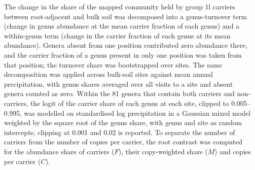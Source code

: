 The change in the share of the mapped community held by group 1l carriers between root-adjacent and bulk
soil was decomposed into a genus-turnover term (change in genus abundance at the mean carrier fraction of
each genus) and a within-genus term (change in the carrier fraction of each genus at its mean abundance).
Genera absent from one position contributed zero abundance there, and the carrier fraction of a genus
present in only one position was taken from that position; the turnover share was bootstrapped over sites.
The same decomposition was applied across bulk-soil sites against mean annual precipitation, with genus
shares averaged over all visits to a site and absent genera counted as zero. Within the 81 genera that
contain both carriers and non-carriers, the logit of the carrier share of each genus at each site, clipped
to 0.005--0.995, was modelled on standardised log precipitation in a Gaussian mixed model weighted by the
square root of the genus share, with genus and site as random intercepts; clipping at 0.001 and 0.02 is
reported. To separate the number of carriers from the number of copies per
carrier, the root contrast was computed for the abundance share of carriers ($F$), their copy-weighted share
($M$) and copies per carrier ($C$).

